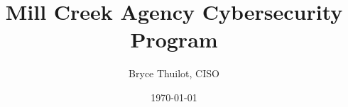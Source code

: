 \title{Mill Creek Agency Cybersecurity Program}
\author{Bryce Thuilot, CISO}
\date{\today}
\usepackage{tikz}
\usetikzlibrary{arrows,automata}
\usepackage{amsmath}
\usepackage{array}
\usepackage{hhline}
\usepackage{listings}
